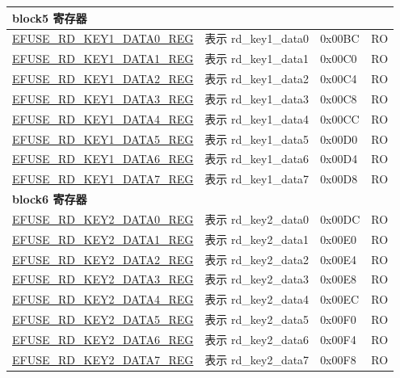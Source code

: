 \begin{longtable}{ | p{7cm} | p{6cm} | p{1.2cm} | p{1.5cm} | }
\multicolumn{4}{|l|}{\textbf{block5 寄存器}} \\ \hline
\hyperref[regdesc:EFUSERDKEY1DATANREG]{EFUSE\_RD\_KEY1\_DATA0\_REG} & 表示 rd\_key1\_data0 & 0x00BC & RO \\ \hline
\hyperref[regdesc:EFUSERDKEY1DATANREG]{EFUSE\_RD\_KEY1\_DATA1\_REG} & 表示 rd\_key1\_data1 & 0x00C0 & RO \\ \hline
\hyperref[regdesc:EFUSERDKEY1DATANREG]{EFUSE\_RD\_KEY1\_DATA2\_REG} & 表示 rd\_key1\_data2 & 0x00C4 & RO \\ \hline
\hyperref[regdesc:EFUSERDKEY1DATANREG]{EFUSE\_RD\_KEY1\_DATA3\_REG} & 表示 rd\_key1\_data3 & 0x00C8 & RO \\ \hline
\hyperref[regdesc:EFUSERDKEY1DATANREG]{EFUSE\_RD\_KEY1\_DATA4\_REG} & 表示 rd\_key1\_data4 & 0x00CC & RO \\ \hline
\hyperref[regdesc:EFUSERDKEY1DATANREG]{EFUSE\_RD\_KEY1\_DATA5\_REG} & 表示 rd\_key1\_data5 & 0x00D0 & RO \\ \hline
\hyperref[regdesc:EFUSERDKEY1DATANREG]{EFUSE\_RD\_KEY1\_DATA6\_REG} & 表示 rd\_key1\_data6 & 0x00D4 & RO \\ \hline
\hyperref[regdesc:EFUSERDKEY1DATANREG]{EFUSE\_RD\_KEY1\_DATA7\_REG} & 表示 rd\_key1\_data7 & 0x00D8 & RO \\ \hline
\multicolumn{4}{|l|}{\textbf{block6 寄存器}} \\ \hline
\hyperref[regdesc:EFUSERDKEY2DATANREG]{EFUSE\_RD\_KEY2\_DATA0\_REG} & 表示 rd\_key2\_data0 & 0x00DC & RO \\ \hline
\hyperref[regdesc:EFUSERDKEY2DATANREG]{EFUSE\_RD\_KEY2\_DATA1\_REG} & 表示 rd\_key2\_data1 & 0x00E0 & RO \\ \hline
\hyperref[regdesc:EFUSERDKEY2DATANREG]{EFUSE\_RD\_KEY2\_DATA2\_REG} & 表示 rd\_key2\_data2 & 0x00E4 & RO \\ \hline
\hyperref[regdesc:EFUSERDKEY2DATANREG]{EFUSE\_RD\_KEY2\_DATA3\_REG} & 表示 rd\_key2\_data3 & 0x00E8 & RO \\ \hline
\hyperref[regdesc:EFUSERDKEY2DATANREG]{EFUSE\_RD\_KEY2\_DATA4\_REG} & 表示 rd\_key2\_data4 & 0x00EC & RO \\ \hline
\hyperref[regdesc:EFUSERDKEY2DATANREG]{EFUSE\_RD\_KEY2\_DATA5\_REG} & 表示 rd\_key2\_data5 & 0x00F0 & RO \\ \hline
\hyperref[regdesc:EFUSERDKEY2DATANREG]{EFUSE\_RD\_KEY2\_DATA6\_REG} & 表示 rd\_key2\_data6 & 0x00F4 & RO \\ \hline
\hyperref[regdesc:EFUSERDKEY2DATANREG]{EFUSE\_RD\_KEY2\_DATA7\_REG} & 表示 rd\_key2\_data7 & 0x00F8 & RO \\ \hline

\end{longtable}
